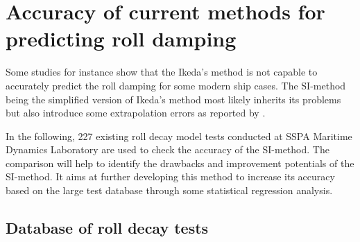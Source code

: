 \section{Accuracy of current methods for predicting roll damping}
\label{se:accuracy_SI_method}
Some studies for instance \parencite{soder_assessment_2019} show that the Ikeda's method is not capable to accurately predict the roll damping for some modern ship cases. The SI-method being the simplified version of Ikeda's method most likely inherits its problems but also introduce some extrapolation errors as reported by \parencite{rudakovic_application_2017}. 

In the following, 227 existing roll decay model tests conducted at SSPA Maritime Dynamics Laboratory are used to check the accuracy of the SI-method. The comparison will help to identify the drawbacks and improvement potentials of the SI-method. It aims at further developing this method to increase its accuracy based on the large test database through some statistical regression analysis.     

\subsection{Database of roll decay tests}
\label{se:database_of_roll_decay_tests}




